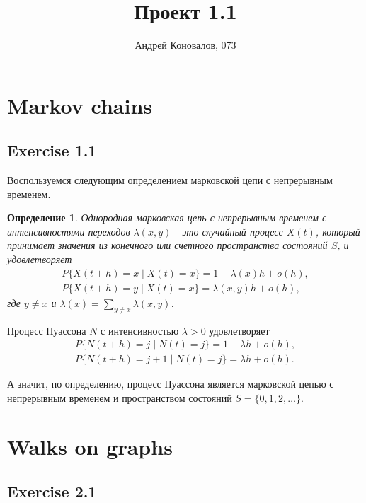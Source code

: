 \documentclass[10pt]{article}
\title{Проект 1.1}
\author{Андрей Коновалов, 073}
\date{}
\newtheorem{definition}{Определение}
\begin{document}
\maketitle

\section{Markov chains}

\subsection{Exercise 1.1}

Воспользуемся следующим определением марковской цепи с непрерывным временем.

\begin{definition}
  Однородная марковская цепь с непрерывным временем с интенсивностями переходов $\lambda(x, y)$ - это случайный процесс $X(t)$, который принимает значения из конечного или счетного пространства состояний $S$, и удовлетворяет
  \begin{gather*}
    P\{X(t + h) = x \; | \; X(t) = x\} = 1 - \lambda(x) h + o(h), \\
    P\{X(t + h) = y \; | \; X(t) = x\} = \lambda(x, y) h + o(h),
  \end{gather*}
  где $y \neq x$ и $\lambda(x) = \sum\limits_{y \neq x} \lambda(x, y)$.
\end{definition}

Процесс Пуассона $N$ с интенсивностью $\lambda > 0$ удовлетворяет
\begin{gather*}
  P\{N(t + h) = j \; | \; N(t) = j\} = 1 - \lambda h + o(h), \\
  P\{N(t + h) = j + 1 \; | \; N(t) = j\} = \lambda h + o(h).
\end{gather*}

А значит, по определению, процесс Пуассона является марковской цепью с непрерывным временем и пространством состояний $S = \{0, 1, 2, \ldots \}$.

\section{Walks on graphs}

\subsection{Exercise 2.1}
\end{document}
